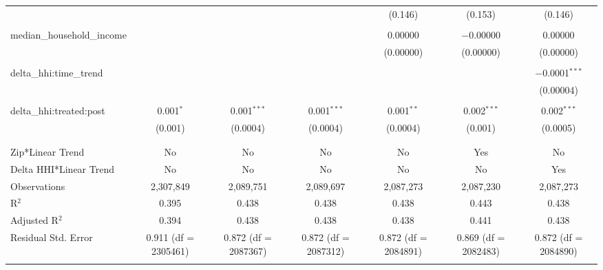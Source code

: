 \begin{table}[H]
{\begin{tabular}{@{\extracolsep{5pt}}lcccccc}
   &  &  &  & (0.146) & (0.153) & (0.146) \\  

   & & & & & & \\  

  median\_household\_income &  &  &  & 0.00000 & $-$0.00000 & 0.00000 \\  

   &  &  &  & (0.00000) & (0.00000) & (0.00000) \\  

   & & & & & & \\  

  delta\_hhi:time\_trend &  &  &  &  &  & $-$0.0001$^{***}$ \\  

   &  &  &  &  &  & (0.00004) \\  

   & & & & & & \\  

  delta\_hhi:treated:post & 0.001$^{*}$ & 0.001$^{***}$ & 0.001$^{***}$ & 0.001$^{**}$ & 0.002$^{***}$ & 0.002$^{***}$ \\  

   & (0.001) & (0.0004) & (0.0004) & (0.0004) & (0.001) & (0.0005) \\  

   & & & & & & \\  

 \hline \\[-1.8ex]  

 Zip*Linear Trend & No & No & No & No & Yes & No \\  

 Delta HHI*Linear Trend & No & No & No & No & No & Yes \\  

 Observations & 2,307,849 & 2,089,751 & 2,089,697 & 2,087,273 & 2,087,230 & 2,087,273 \\  

 R$^{2}$ & 0.395 & 0.438 & 0.438 & 0.438 & 0.443 & 0.438 \\  

 Adjusted R$^{2}$ & 0.394 & 0.438 & 0.438 & 0.438 & 0.441 & 0.438 \\  

 Residual Std. Error & 0.911 (df = 2305461) & 0.872 (df = 2087367) & 0.872 (df = 2087312) & 0.872 (df = 2084891) & 0.869 (df = 2082483) & 0.872 (df = 2084890) \\  

 \hline  

 \hline \\[-1.8ex]  


\end{tabular}}
\end{table}
